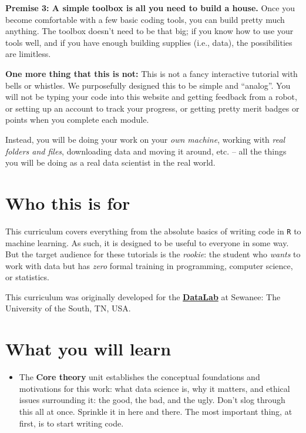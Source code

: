 \documentclass[]{book}
\providecommand{\tightlist}{%
  \setlength{\itemsep}{0pt}\setlength{\parskip}{0pt}}
\begin{document}
\textbf{Premise 3: A simple toolbox is all you need to build a house.} Once you become comfortable with a few basic coding tools, you can build pretty much anything. The toolbox doesn't need to be that big; if you know how to use your tools well, and if you have enough building supplies (i.e., data), the possibilities are limitless.

\textbf{One more thing that this is not:} This is not a fancy interactive tutorial with bells or whistles. We purposefully designed this to be simple and ``analog''. You will not be typing your code into this website and getting feedback from a robot, or setting up an account to track your progress, or getting pretty merit badges or points when you complete each module.

Instead, you will be doing your work on your \emph{own machine}, working with \emph{real folders and files}, downloading data and moving it around, etc. -- all the things you will be doing as a real data scientist in the real world.

\hypertarget{who-this-is-for}{%
\section*{Who this is for}\label{who-this-is-for}}

This curriculum covers everything from the absolute basics of writing code in \texttt{R} to machine learning. As such, it is designed to be useful to everyone in some way. But the target audience for these tutorials is the \emph{rookie}: the student who \emph{wants} to work with data but has \emph{zero} formal training in programming, computer science, or statistics.

This curriculum was originally developed for the \href{https://new.sewanee.edu/sewanee-datalab/}{\textbf{DataLab}} at Sewanee: The University of the South, TN, USA.

\hypertarget{what-you-will-learn}{%
\section*{What you will learn}\label{what-you-will-learn}}

\begin{itemize}
\tightlist
\item
  The \textbf{Core theory} unit establishes the conceptual foundations and motivations for this work: what data science is, why it matters, and ethical issues surrounding it: the good, the bad, and the ugly. Don't slog through this all at once. Sprinkle it in here and there. The most important thing, at first, is to start writing code.
\end{itemize}
\end{document}
